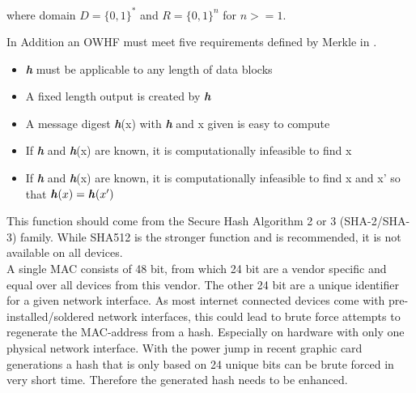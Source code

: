         where domain $D = \{0,1\}^*$ and $R=\{0,1\}^n$ for $n >= 1$.
        
        In Addition an OWHF must meet five requirements defined by Merkle in \cite{merkle_secrecy_1979}.
        \begin{itemize}
            \item \textbf{\textit{h}} must be applicable to any length of data blocks
            \item A fixed length output is created by \textbf{\textit{h}}
            \item A message digest \textbf{\textit{h}}(x) with \textbf{\textit{h}} and x given is easy to compute
            \item If \textbf{\textit{h}} and \textbf{\textit{h}}(x) are known, it is computationally infeasible to find x
            \item If \textbf{\textit{h}} and \textbf{\textit{h}}(x) are known, it is computationally infeasible to find x and x' so that $\textbf{\textit{h}}(x) = \textbf{\textit{h}}(x')$
        \end{itemize}
        
        This function should come from the Secure Hash Algorithm 2 or 3 (SHA-2/SHA-3) family. While SHA512 is the stronger function and is recommended, it is not available on all devices.\\
        A single MAC consists of 48 bit, from which 24 bit are a vendor specific and equal over all devices from this vendor. The other 24 bit are a unique identifier for a given network interface. As most internet connected devices come with pre-installed/soldered network interfaces, this could lead to brute force attempts to regenerate the MAC-address from a hash. Especially on hardware with only one physical network interface. With the power jump in recent graphic card generations a hash that is only based on 24 unique bits can be brute forced in very short time. Therefore the generated hash needs to be enhanced.\\
        
